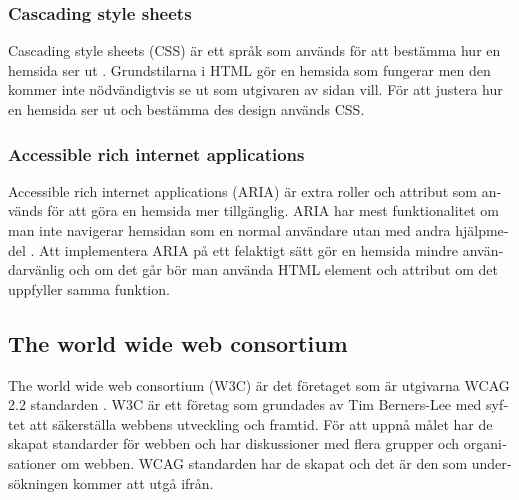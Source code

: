 \documentclass[11p]{article}
\begin{document}
\begin{otherlanguage}{swedish}

    \subsubsection{Cascading style sheets}
    Cascading style sheets (CSS) är ett språk som används för att bestämma hur en hemsida ser ut \parencite{CSS}.
    Grundstilarna i HTML gör en hemsida som fungerar men den kommer inte nödvändigtvis se ut som utgivaren av sidan vill.
    För att justera hur en hemsida ser ut och bestämma des design används CSS.

    \subsubsection{Accessible rich internet applications}
    Accessible rich internet applications (ARIA) är extra roller och attribut som används för att göra en hemsida mer tillgänglig.
    ARIA har mest funktionalitet om man inte navigerar hemsidan som en normal användare utan med andra hjälpmedel \parencite{ARIA}.
    Att implementera ARIA på ett felaktigt sätt gör en hemsida mindre användarvänlig och om det går bör man använda HTML element och attribut om det uppfyller samma funktion.
    
    \subsection{The world wide web consortium}
    The world wide web consortium (W3C) är det företaget som är utgivarna WCAG 2.2 standarden \parencite{W3C}.
    W3C är ett företag som grundades av Tim Berners-Lee med syftet att säkerställa webbens utveckling och framtid.
    För att uppnå målet har de skapat standarder för webben och har diskussioner med flera grupper och organisationer om webben.
    WCAG standarden har de skapat och det är den som undersökningen kommer att utgå ifrån.


\end{otherlanguage}
\end{document}

